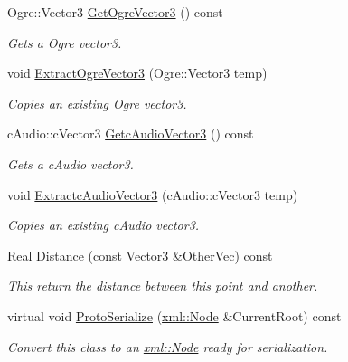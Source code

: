 \begin{DoxyCompactItemize}
Ogre::Vector3 \hyperlink{classphys_1_1Vector3_a17265d86a74139398d310b56ba7e89b8}{GetOgreVector3} () const 
\begin{DoxyCompactList}\small\item\em Gets a Ogre vector3. \item\end{DoxyCompactList}\item 
void \hyperlink{classphys_1_1Vector3_a09a31cb8fe491f61e0cc10d21705a0df}{ExtractOgreVector3} (Ogre::Vector3 temp)
\begin{DoxyCompactList}\small\item\em Copies an existing Ogre vector3. \item\end{DoxyCompactList}\item 
cAudio::cVector3 \hyperlink{classphys_1_1Vector3_a58b1ac39dfee4c360c16944a7e7f657d}{GetcAudioVector3} () const 
\begin{DoxyCompactList}\small\item\em Gets a cAudio vector3. \item\end{DoxyCompactList}\item 
void \hyperlink{classphys_1_1Vector3_aa12021e9cdc092c8628ced1c5910c04c}{ExtractcAudioVector3} (cAudio::cVector3 temp)
\begin{DoxyCompactList}\small\item\em Copies an existing cAudio vector3. \item\end{DoxyCompactList}\item 
\hyperlink{namespacephys_af7eb897198d265b8e868f45240230d5f}{Real} \hyperlink{classphys_1_1Vector3_af59a586331fe9497056b7e0f207658a3}{Distance} (const \hyperlink{classphys_1_1Vector3}{Vector3} \&OtherVec) const 
\begin{DoxyCompactList}\small\item\em This return the distance between this point and another. \item\end{DoxyCompactList}\item 
virtual void \hyperlink{classphys_1_1Vector3_a6713cfb8c5cd8918701ec8bee58b7322}{ProtoSerialize} (\hyperlink{classphys_1_1xml_1_1Node}{xml::Node} \&CurrentRoot) const 
\begin{DoxyCompactList}\small\item\em Convert this class to an \hyperlink{classphys_1_1xml_1_1Node}{xml::Node} ready for serialization. \item\end{DoxyCompactList}\item 

\end{DoxyCompactItemize}
